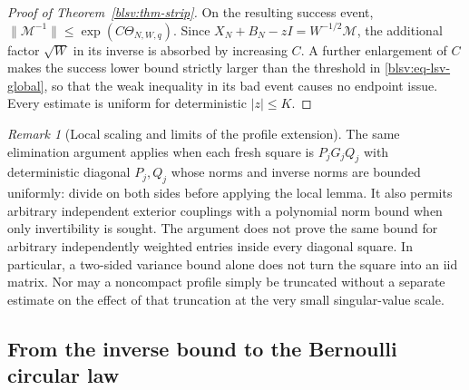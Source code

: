 \documentclass[11pt,reqno]{amsart}
\numberwithin{equation}{section}
\theoremstyle{plain}
\theoremstyle{definition}
\theoremstyle{remark}
\newtheorem{remark}[theorem]{Remark}
\begin{document}
\begin{proof}[Proof of Theorem~\ref{blsv:thm-strip}]
On the resulting success event,
$\|\mathcal M^{-1}\|\le\exp(C\Theta_{N,W,q})$.
Since $X_N+B_N-zI=W^{-1/2}\mathcal M$, the additional factor $\sqrt W$
in its inverse is absorbed by increasing $C$. A further enlargement
of $C$ makes the success lower bound strictly larger than the threshold
in \eqref{blsv:eq-lsv-global}, so that the weak inequality in its bad
event causes no endpoint issue. Every estimate is uniform for
deterministic $|z|\le K$.
\end{proof}

\begin{remark}[Local scaling and limits of the profile extension]
The same elimination argument applies when each fresh square is
$P_jG_jQ_j$ with deterministic diagonal $P_j,Q_j$ whose norms and inverse
norms are bounded uniformly: divide on both sides before applying the
local lemma. It also permits arbitrary independent exterior couplings
with a polynomial norm bound when only invertibility is sought.
The argument does not prove the same bound for arbitrary independently
weighted entries inside every diagonal square. In particular, a
two-sided variance bound alone does not turn the square into an iid
matrix. Nor may a noncompact profile simply be truncated without a
separate estimate on the effect of that truncation at the very small
singular-value scale.
\end{remark}

\subsection{From the inverse bound to the Bernoulli circular law}
\label{blsv:sec-circle}
\end{document}
